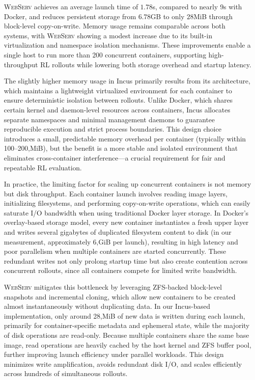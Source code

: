 \documentclass{article}
\DeclareRobustCommand{\projectname}{\textsc{WebServ}\xspace}
\begin{document}
\projectname achieves an average launch time of $1.78$s, compared to nearly $9$s with Docker, and reduces persistent storage from $6.78$GB to only $28$MiB through block-level copy-on-write.
Memory usage remains comparable across both systems, with \projectname showing a modest increase due to its built-in virtualization and namespace isolation mechanisms.
These improvements enable a single host to run more than 200 concurrent containers, supporting high-throughput RL rollouts while lowering both storage overhead and startup latency.


The slightly higher memory usage in Incus primarily results from its architecture, which maintains a lightweight virtualized environment for each container to ensure deterministic isolation between rollouts.
Unlike Docker, which shares certain kernel and daemon-level resources across containers, Incus allocates separate namespaces and minimal management daemons to guarantee reproducible execution and strict process boundaries.
This design choice introduces a small, predictable memory overhead per container (typically within 100–200,MiB), but the benefit is a more stable and isolated environment that eliminates cross-container interference—a crucial requirement for fair and repeatable RL evaluation.

In practice, the limiting factor for scaling up concurrent containers is not memory but disk throughput. Each container launch involves reading image layers, initializing filesystems, and performing copy-on-write operations, which can easily saturate I/O bandwidth when using traditional Docker layer storage. In Docker's overlay-based storage model, every new container instantiates a fresh upper layer and writes several gigabytes of duplicated filesystem content to disk (in our measurement, approximately 6,GiB per launch), resulting in high latency and poor parallelism when multiple containers are started concurrently. These redundant writes not only prolong startup time but also create contention across concurrent rollouts, since all containers compete for limited write bandwidth.

\projectname mitigates this bottleneck by leveraging ZFS-backed block-level snapshots and incremental cloning, which allow new containers to be created almost instantaneously without duplicating data. In our Incus-based implementation, only around 28,MiB of new data is written during each launch, primarily for container-specific metadata and ephemeral state, while the majority of disk operations are read-only. Because multiple containers share the same base image, read operations are heavily cached by the host kernel and ZFS buffer pool, further improving launch efficiency under parallel workloads. This design minimizes write amplification, avoids redundant disk I/O, and scales efficiently across hundreds of simultaneous rollouts.
\end{document}
